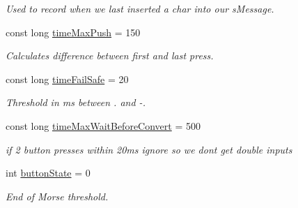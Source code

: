 \begin{DoxyCompactItemize}
\begin{DoxyCompactList}\small\item\em Used to record when we last inserted a char into our s\+Message. \end{DoxyCompactList}\item 
\mbox{\label{_arduino_morse_client_8ino_adaa28d39a68ea298c4efea85b798aa7d}} 
const long \mbox{\hyperlink{_arduino_morse_client_8ino_adaa28d39a68ea298c4efea85b798aa7d}{time\+Max\+Push}} = 150
\begin{DoxyCompactList}\small\item\em Calculates difference between first and last press. \end{DoxyCompactList}\item 
\mbox{\label{_arduino_morse_client_8ino_a5a2c0943e6069c9e8606218651a40f4a}} 
const long \mbox{\hyperlink{_arduino_morse_client_8ino_a5a2c0943e6069c9e8606218651a40f4a}{time\+Fail\+Safe}} = 20
\begin{DoxyCompactList}\small\item\em Threshold in ms between \textquotesingle{}.\textquotesingle{} and \textquotesingle{}-\/\textquotesingle{}. \end{DoxyCompactList}\item 
\mbox{\label{_arduino_morse_client_8ino_a611e71e8ab7240e999fa22364bb844f4}} 
const long \mbox{\hyperlink{_arduino_morse_client_8ino_a611e71e8ab7240e999fa22364bb844f4}{time\+Max\+Wait\+Before\+Convert}} = 500
\begin{DoxyCompactList}\small\item\em if 2 button presses within 20ms ignore so we don\textquotesingle{}t get double inputs \end{DoxyCompactList}\item 
\mbox{\label{_arduino_morse_client_8ino_a5002611f83f5a861df12917dd5651db8}} 
int \mbox{\hyperlink{_arduino_morse_client_8ino_a5002611f83f5a861df12917dd5651db8}{button\+State}} = 0
\begin{DoxyCompactList}\small\item\em End of Morse threshold. \end{DoxyCompactList}\item 
\mbox{\label{_arduino_morse_client_8ino_a986feb0ed834c2e1498a4158aad806c4}} 

\end{DoxyCompactItemize}
